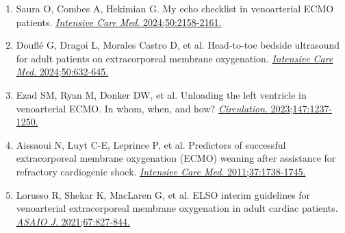 \documentclass[12pt,a4paper]{article}
\begin{document}
\begin{enumerate}
    \item Saura O, Combes A, Hekimian G. My echo checklist in venoarterial ECMO patients. \href{https://doi.org/10.1007/s00134-024-07659-2}{\textit{Intensive Care Med}. 2024;50:2158-2161.}

    \item Douflé G, Dragoi L, Morales Castro D, et al. Head-to-toe bedside ultrasound for adult patients on extracorporeal membrane oxygenation. \href{https://doi.org/10.1007/s00134-024-07333-7}{\textit{Intensive Care Med}. 2024;50:632-645.}

    \item Ezad SM, Ryan M, Donker DW, et al. Unloading the left ventricle in venoarterial ECMO. In whom, when, and how? \href{https://doi.org/10.1161/CIRCULATIONAHA.122.062371}{\textit{Circulation}. 2023;147:1237-1250.}

    \item Aissaoui N, Luyt C-E, Leprince P, et al. Predictors of successful extracorporeal membrane oxygenation (ECMO) weaning after assistance for refractory cardiogenic shock. \href{https://doi.org/10.1007/s00134-011-2358-2}{\textit{Intensive Care Med}. 2011;37:1738-1745.}

    \item Lorusso R, Shekar K, MacLaren G, et al. ELSO interim guidelines for venoarterial extracorporeal membrane oxygenation in adult cardiac patients. \href{https://doi.org/10.1097/MAT.0000000000001510}{\textit{ASAIO J}. 2021;67:827-844.}
\end{enumerate}
\end{document}
